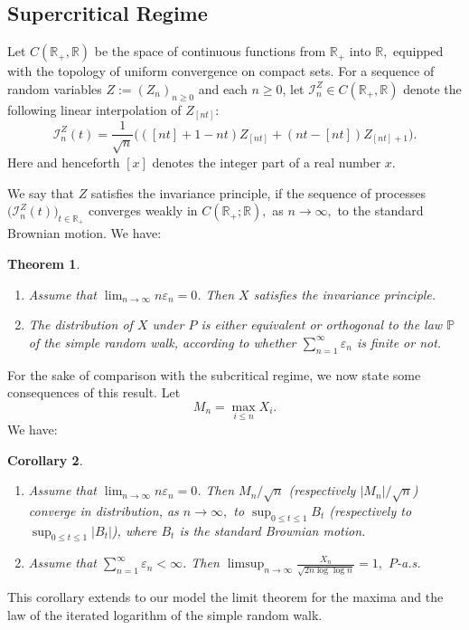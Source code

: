 \documentclass[12pt]{amsart}
\newtheorem{theorem}{Theorem} \makeatletter
\newtheorem{corollary}[theorem]{Corollary}
\begin{document}
\subsection{Supercritical Regime}
Let $C({{\mathbb R}}_+,{{\mathbb R}})$ be the space of continuous functions from ${{\mathbb R}}_+$ into ${{\mathbb R}},$
equipped with the topology of uniform convergence on compact sets.
For a sequence of random variables $Z:=(Z_n)_{n\ge0}$ and each $n\ge 0$,
let ${{\mathcal I}}^{Z}_n \in C({{\mathbb R}}_+,{{\mathbb R}})$ denote the following linear interpolation of $Z_{[nt]}$:
\begin{equation}
\label{esn} {{\mathcal I}}^Z_n(t) = {\frac {\displaystyle {1}}{\displaystyle {\sqrt{n}} }}\bigl(([nt]+1-nt)
Z_{[nt]} + (nt-[nt]) Z_{[nt]+1}\bigr).
\end{equation}
Here and henceforth $[x]$ denotes the integer part of a real number $x.$
\par
We say that $Z$ satisfies the invariance principle, if the sequence of processes
$\bigl({{\mathcal I}}_n^Z(t)\bigr)_{t \in {{\mathbb R}}_+}$ converges weakly in
$C({{\mathbb R}}_+;{{\mathbb R}}),$ as $n\to\infty,$ to the standard Brownian motion. We have:
\begin{theorem}~
\label{th:main}
\begin{enumerate}
\item  Assume that $\lim_{n\to\infty} n {\varepsilon}_n =0$.  Then $X$ satisfies the invariance principle.
\item  The distribution of $X$ under $P$ is either equivalent or orthogonal to
the law ${{\mathbb P}}$ of the simple random walk, according to whether $\sum_{n=1}^{\infty} {\varepsilon}_n$ is finite or not.
\end{enumerate}
\end{theorem}
For the sake of comparison with the subcritical regime, we now state some
consequences of this result. Let
\begin{equation}
\label{maxima} M_n=\max_{i\leq n} X_i.
\end{equation}
We have:
\begin{corollary}~
\label{mainc}
\begin{enumerate}
\item
Assume that $\lim_{n\to\infty} n {\varepsilon}_n =0$. Then $M_n/\sqrt{n}$
(respectively $|M_n|/\sqrt{n}$) converge in distribution, as
$n\to\infty,$ to $\sup_{0\leq t\leq 1} B_t$ (respectively to
$\sup_{0\leq t\leq 1} |B_t|$), where $B_t$ is the standard Brownian
motion.
\item
Assume that $\sum_{n=1}^{\infty} {\varepsilon}_n <\infty$.
Then $\displaystyle \limsup_{n\to\infty} \frac{X_n}{\sqrt{2n\log\log n}}=1,$ $P$-\mbox{\rm a.s.}
\end{enumerate}
\end{corollary}
This corollary extends to our model the limit theorem for the maxima and the law of the
iterated logarithm of the simple random walk.
\end{document}
